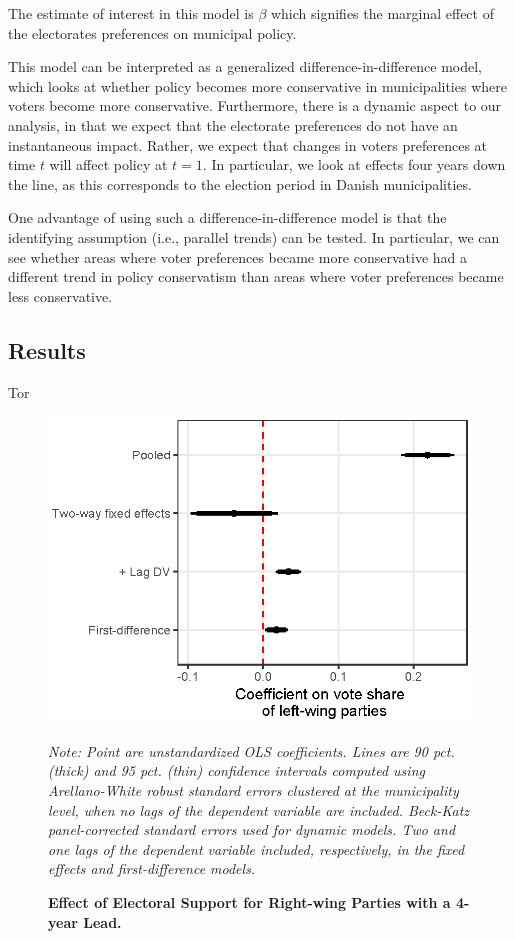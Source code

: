 \documentclass[a4paper,12pt]{article}
\newcommand\fnote[1]{\captionsetup{font=small}\caption*{#1}}
\begin{document}
The estimate of interest in this model is $\beta$ which signifies the marginal effect of the electorates preferences on municipal policy.

This model can be interpreted as a generalized difference-in-difference model, which looks at whether policy becomes more conservative in municipalities where voters become more conservative. Furthermore, there is a dynamic aspect to our analysis, in that we expect that the electorate preferences do not have an instantaneous impact. Rather, we expect that changes in voters preferences at time $t$ will affect policy at $t=1$. In particular, we look at effects four years down the line, as this corresponds to the election period in Danish municipalities. 

One advantage of using such a difference-in-difference model is that the identifying assumption (i.e., parallel trends) can be tested. In particular, we can see whether areas where voter preferences became more conservative had a different trend in policy conservatism than areas where voter preferences became less conservative.  


\subsection{Results}

Tor


\begin{figure}[h]
	\centering
	\includegraphics[scale = 1.1]{ggplot_coef_inflation_adjusted.eps}
	\caption{\textbf{Effect of Electoral Support for Right-wing Parties with a 4-year Lead.}} \fnote{\emph{Note: Point are unstandardized OLS coefficients. Lines are 90 pct. (thick) and 95 pct. (thin) confidence intervals computed using Arellano-White robust standard errors clustered at the municipality level, when no lags of the dependent variable are included. Beck-Katz panel-corrected standard errors used for dynamic models. Two and one lags of the dependent variable included, respectively, in the fixed effects and first-difference models.}}
	\label{fig:FourYearLead}
\end{figure}
\end{document}

